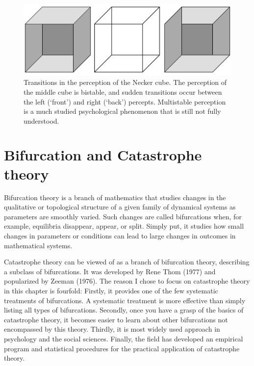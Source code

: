 \documentclass[
  a4paper,
  DIV=11,
  numbers=noendperiod]{scrreprt}
\begin{document}
\begin{figure}

{\centering \includegraphics{media/ch3/ch3-02__figure14.png}

}

\caption{\label{fig-ch3-img2-old-14}Transitions in the perception of the
Necker cube. The perception of the middle cube is bistable, and sudden
transitions occur between the left (`front') and right (`back')
percepts. Multistable perception is a much studied psychological
phenomenon that is still not fully understood.}

\end{figure}

\hypertarget{sec-Bifurcation-and-Catastrophe-theory}{%
\section{Bifurcation and Catastrophe
theory}\label{sec-Bifurcation-and-Catastrophe-theory}}

Bifurcation theory is a branch of mathematics that studies changes in
the qualitative or topological structure of a given family of dynamical
systems as parameters are smoothly varied. Such changes are called
bifurcations when, for example, equilibria disappear, appear, or split.
Simply put, it studies how small changes in parameters or conditions can
lead to large changes in outcomes in mathematical systems.

Catastrophe theory can be viewed of as a branch of bifurcation theory,
describing a subclass of bifurcations. It was developed by Rene Thom
(1977) and popularized by Zeeman (1976). The reason I chose to focus on
catastrophe theory in this chapter is fourfold: Firstly, it provides one
of the few systematic treatments of bifurcations. A systematic treatment
is more effective than simply listing all types of bifurcations.
Secondly, once you have a grasp of the basics of catastrophe theory, it
becomes easier to learn about other bifurcations not encompassed by this
theory. Thirdly, it is most widely used approach in psychology and the
social sciences. Finally, the field has developed an empirical program
and statistical procedures for the practical application of catastrophe
theory.
\end{document}

